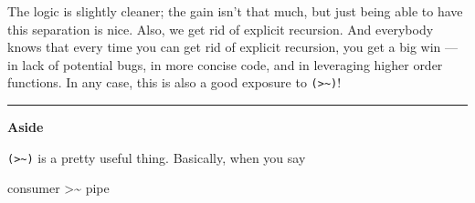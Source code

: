 \documentclass[]{article}
\newenvironment{Shaded}{}{}
\newcommand{\CommentTok}[1]{\textcolor[rgb]{0.38,0.63,0.69}{\textit{#1}}}
\newcommand{\DataTypeTok}[1]{\textcolor[rgb]{0.56,0.13,0.00}{#1}}
\newcommand{\FunctionTok}[1]{\textcolor[rgb]{0.02,0.16,0.49}{#1}}
\newcommand{\KeywordTok}[1]{\textcolor[rgb]{0.00,0.44,0.13}{\textbf{#1}}}
\newcommand{\NormalTok}[1]{#1}
\newcommand{\OperatorTok}[1]{\textcolor[rgb]{0.40,0.40,0.40}{#1}}
\newcommand{\OtherTok}[1]{\textcolor[rgb]{0.00,0.44,0.13}{#1}}
\begin{document}
\begin{Shaded}
\end{Shaded}

The logic is slightly cleaner; the gain isn't that much, but just being able to
have this separation is nice. Also, we get rid of explicit recursion. And
everybody knows that every time you can get rid of explicit recursion, you get a
big win --- in lack of potential bugs, in more concise code, and in leveraging
higher order functions. In any case, this is also a good exposure to
\texttt{(\textgreater{}\textasciitilde{})}!

\begin{center}\rule{0.5\linewidth}{\linethickness}\end{center}

\textbf{Aside}

\texttt{(\textgreater{}\textasciitilde{})} is a pretty useful thing. Basically,
when you say

\begin{Shaded}
\begin{Highlighting}[]
\NormalTok{consumer }\OperatorTok{>\textasciitilde{}}\NormalTok{ pipe}
\end{Highlighting}
\end{Shaded}
\end{document}
